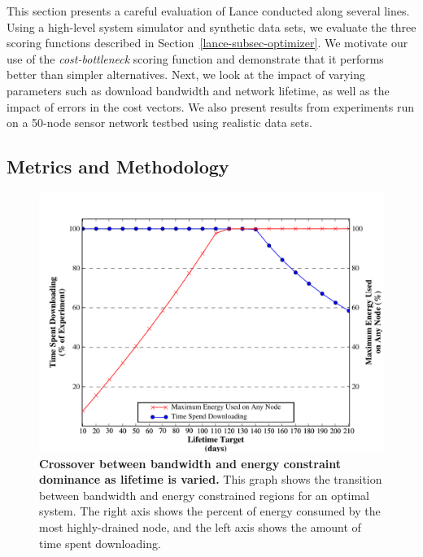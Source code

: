 This section presents a careful evaluation of Lance conducted along several
lines. Using a high-level system simulator and synthetic data sets, we
evaluate the three scoring functions described in
Section~\ref{lance-subsec-optimizer}. We motivate our use of the
\textit{cost-bottleneck} scoring function and demonstrate that it performs
better than simpler alternatives. Next, we look at the impact of varying
parameters such as download bandwidth and network lifetime, as well as the
impact of errors in the cost vectors. We also present results from
experiments run on a 50-node sensor network testbed using realistic data
sets.

\subsection{Metrics and Methodology}

\begin{figure}[t]
\begin{center}
\includegraphics[width=1.0\hsize]{./4-lance/figs/used/crossover.pdf}
\end{center}

\caption{\textbf{Crossover between bandwidth and energy constraint dominance
as lifetime is varied.} This graph shows the transition between bandwidth and
energy constrained regions for an optimal system. The right axis shows the
percent of energy consumed by the most highly-drained node, and the left axis
shows the amount of time spent downloading.}

\label{lance-fig-crossover}
\end{figure}

